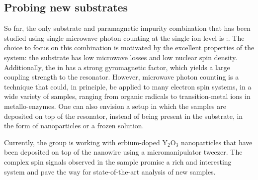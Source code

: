 \subsection*{Probing new substrates}

So far, the only substrate and paramagnetic impurity combination that has been studied using single microwave photon counting at the single ion level is \Er:\Ca. The choice to focus on this combination is motivated by the excellent properties of the system: the substrate has low microwave losses and low nuclear spin density. Additionally, the \Er in \Ca has a strong gyromagnetic factor, which yields a large coupling strength to the resonator. However, microwave photon counting is a technique that could, in principle, be applied to many electron spin systems, in a wide variety of samples, ranging from organic radicals to transition-metal ions in metallo-enzymes. One can also envision a setup in which the samples are deposited on top of the resonator, instead of being present in the substrate, in the form of nanoparticles or a frozen solution.

Currently, the group is working with erbium-doped Y$_2$O$_3$ nanoparticles that have been deposited on top of the nanowire using a micromanipulator tweezer. The complex spin signals observed in the sample promise a rich and interesting system and pave the way for state-of-the-art analysis of new samples.